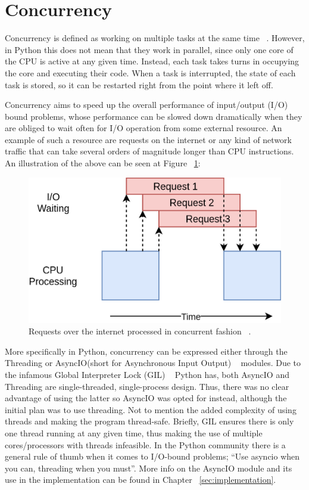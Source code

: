 \section{Concurrency}
Concurrency is defined as working on multiple tasks at the same time ~\cite{concurrency_realpython}. However, in Python this does not mean that they work in parallel, since only one core of the CPU is active at any given time. Instead, each task takes turns in occupying the core and executing their code. When a task is interrupted, the state of each task is stored, so it can be restarted right from the point where it left off. 

Concurrency aims to speed up the overall performance of input/output (I/O) bound problems, whose performance can be slowed down dramatically when they are obliged to wait often for I/O operation from some external resource. An example of such a resource are requests on the internet or any kind of network traffic that can take several orders of magnitude longer than CPU instructions. An illustration of the above can be seen at Figure ~\ref{fig:concurrency_example}:

\begin{figure}[ht]
 \centering
 \includegraphics[width=\linewidth]{figures/concurrency_example.png}
 \caption{Requests over the internet processed in concurrent fashion ~\cite{concurrency_realpython}.}
 \label{fig:concurrency_example}
\end{figure}

More specifically in Python, concurrency can be expressed either through the Threading or AsyncIO(short for Asynchronous Input Output) ~\cite{asyncio} modules. Due to the infamous Global Interpreter Lock (GIL) ~\cite{gil_realpython} Python has, both AsyncIO and Threading are single-threaded, single-process design. Thus, there was no clear advantage of using the latter so AsyncIO was opted for instead, although the initial plan was to use threading. Not to mention the added complexity of using threads and making the program thread-safe. Briefly, GIL ensures there is only one thread running at any given time, thus making the use of multiple cores/processors with threads infeasible. 
In the Python community there is a general rule of thumb when it comes to I/O-bound problems; “Use asyncio when you can, threading when you must”.
More info on the AsyncIO module and its use in the \pname implementation can be found in Chapter ~\ref{sec:implementation}.

